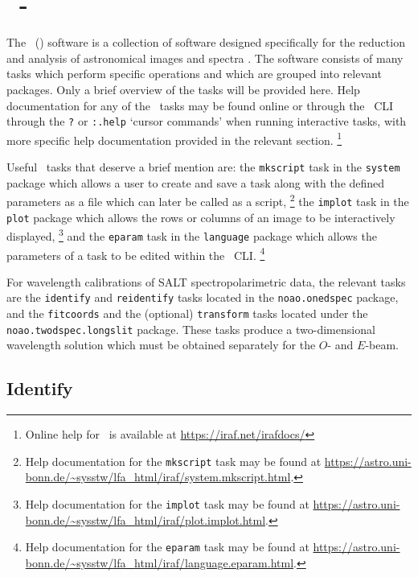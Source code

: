 \section[\textsc{iraf}]{\iraf\ - } \label{sec:iraf}

The \iraf\ () software is a collection of software designed specifically for the reduction and analysis of astronomical images and spectra \citep{iraf:1986, iraf:1993}. The software consists of many tasks which perform specific operations and which are grouped into relevant packages. Only a brief overview of the tasks will be provided here. Help documentation for any of the \iraf\ tasks may be found online or through the \iraf\ \gls{CLI} through the \texttt{?} or \texttt{:.help} `cursor commands' when running interactive tasks, with more specific help documentation provided in the relevant section.%
\footnote{Online help for \iraf\ is available at \url{https://iraf.net/irafdocs/}}

Useful \iraf\ tasks that deserve a brief mention are: the \texttt{mkscript} task in the \texttt{system} package which allows a user to create and save a task along with the defined parameters as a file which can later be called as a script,%
\footnote{Help documentation for the \texttt{mkscript} task may be found at \url{https://astro.uni-bonn.de/~sysstw/lfa_html/iraf/system.mkscript.html}.}
the \texttt{implot} task in the \texttt{plot} package which allows the rows or columns of an image to be interactively displayed,%
\footnote{Help documentation for the \texttt{implot} task may be found at \url{https://astro.uni-bonn.de/~sysstw/lfa_html/iraf/plot.implot.html}.}
and the \texttt{eparam} task in the \texttt{language} package which allows the parameters of a task to be edited within the \iraf\ \gls{CLI}.%
\footnote{Help documentation for the \texttt{eparam} task may be found at \url{https://astro.uni-bonn.de/~sysstw/lfa_html/iraf/language.eparam.html}.}

For wavelength calibrations of \gls{SALT} spectropolarimetric data, the relevant tasks are the \texttt{identify} and \texttt{reidentify} tasks located in the \texttt{noao.onedspec} package, and the \texttt{fitcoords} and the (optional) \texttt{transform} tasks located under the \texttt{noao.twodspec.long\-slit} package. These tasks produce a two-dimensional wavelength solution which must be obtained separately for the $O$- and $E$-beam.

\subsection{Identify}

